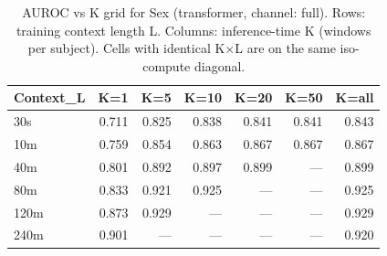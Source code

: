 \begin{table}[ht]
\centering
\caption{AUROC vs K grid for Sex (transformer, channel: full). Rows: training context length L. Columns: inference-time K (windows per subject). Cells with identical K×L are on the same iso-compute diagonal.}
\label{tab:kgrid_sex_binary_transformer_full}
\begin{tabular}{lrrrrrr}
\toprule
Context_L & K=1 & K=5 & K=10 & K=20 & K=50 & K=all \\
\midrule
30s & 0.711 & 0.825 & 0.838 & 0.841 & 0.841 & 0.843 \\
10m & 0.759 & 0.854 & 0.863 & 0.867 & 0.867 & 0.867 \\
40m & 0.801 & 0.892 & 0.897 & 0.899 & — & 0.899 \\
80m & 0.833 & 0.921 & 0.925 & — & — & 0.925 \\
120m & 0.873 & 0.929 & — & — & — & 0.929 \\
240m & 0.901 & — & — & — & — & 0.920 \\
\bottomrule
\end{tabular}
\end{table}